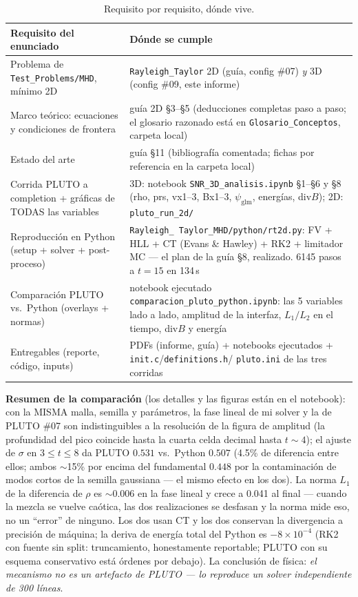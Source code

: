 \documentclass[11pt,a4paper]{article}
\begin{document}
\begin{table}[H]
\centering\small
\caption{Requisito por requisito, dónde vive.}
\begin{tabular}{@{}p{5.6cm}p{9.6cm}@{}}
\toprule
Requisito del enunciado & Dónde se cumple \\
\midrule
Problema de \texttt{Test\_Problems/MHD}, mínimo 2D & \texttt{Rayleigh\_Taylor}
2D (guía, config \#07) \emph{y} 3D (config \#09, este informe) \\
Marco teórico: ecuaciones y condiciones de frontera & guía 2D \S3--\S5
(deducciones completas paso a paso; el glosario razonado está en
\texttt{Glosario\_Conceptos}, carpeta local) \\
Estado del arte & guía \S11 (bibliografía comentada; fichas por referencia en la
carpeta local) \\
Corrida PLUTO a completion + gráficas de TODAS las variables & 3D: notebook
\texttt{SNR\_3D\_analisis.ipynb} \S1--\S6 y \S8 (rho, prs, vx1--3, Bx1--3,
$\psi_\mathrm{glm}$, energías, div$B$); 2D: \texttt{pluto\_run\_2d/} \\
Reproducción en Python (setup + solver + post-proceso) & \texttt{Rayleigh\_%
Taylor\_MHD/python/rt2d.py}: FV + HLL + CT (Evans \& Hawley) + RK2 + limitador
MC --- el plan de la guía \S8, realizado. 6145 pasos a $t{=}15$ en 134\,s \\
Comparación PLUTO vs.\ Python (overlays + normas) & notebook ejecutado
\texttt{comparacion\_pluto\_python.ipynb}: las 5 variables lado a lado,
amplitud de la interfaz, $L_1/L_2$ en el tiempo, div$B$ y energía \\
Entregables (reporte, código, inputs) & PDFs (informe, guía) + notebooks
ejecutados + \texttt{init.c}/\texttt{definitions.h}/%
\texttt{pluto.ini} de las tres corridas \\
\bottomrule
\end{tabular}
\end{table}

\textbf{Resumen de la comparación} (los detalles y las figuras están en el
notebook): con la MISMA malla, semilla y parámetros, la fase lineal de mi solver
y la de PLUTO \#07 son indistinguibles a la resolución de la figura de amplitud
(la profundidad del pico coincide hasta la cuarta celda decimal hasta $t\sim4$);
el ajuste de $\sigma$ en $3\le t\le8$ da PLUTO $0.531$ vs.\ Python $0.507$
(4.5\% de diferencia entre ellos; ambos $\sim$15\% por encima del fundamental
$0.448$ por la contaminación de modos cortos de la semilla gaussiana --- el
mismo efecto en los dos). La norma $L_1$ de la diferencia de $\rho$ es
$\sim$0.006 en la fase lineal y crece a 0.041 al final --- cuando la mezcla se
vuelve caótica, las dos realizaciones se desfasan y la norma mide eso, no un
``error'' de ninguno. Los dos usan CT y los dos conservan la divergencia a
precisión de máquina; la deriva de energía total del Python es
$-8\times10^{-4}$ (RK2 con fuente sin split: truncamiento, honestamente
reportable; PLUTO con su esquema conservativo está órdenes por debajo).
La conclusión de física: \emph{el mecanismo no es un artefacto de PLUTO --- lo
reproduce un solver independiente de 300 líneas}.
\end{document}
